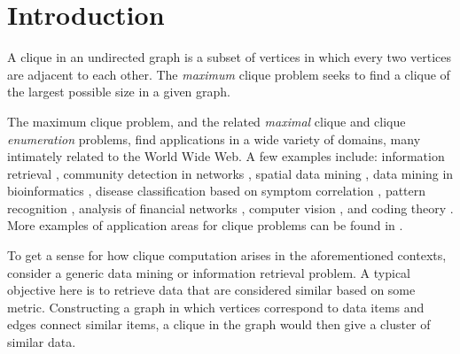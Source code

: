 \section{Introduction}
\label{sec:intro}

A clique in an undirected graph is a subset of vertices in which every two vertices
are adjacent to each other. The {\em maximum} clique problem seeks to find 
a clique of the largest possible size in a given graph.

The maximum clique problem, and the related {\em maximal} clique and 
clique {\em enumeration} problems, find applications in a wide variety of domains,
many intimately related to the World Wide Web. 
A few examples include:  
information retrieval \cite{Augustson:1970:AGT:321607.321608}, 
community detection in networks \cite{Fortunato_2010,cite-key,5586496}, 
spatial data mining \cite{wang2009order},
data mining in bioinformatics \cite{19566964},
disease classification based on symptom correlation \cite{Bonner:1964:CT:1662386.1662389}, 
pattern recognition \cite{1211348},
analysis of financial networks \cite{RePEc:eee:csdana:v:48:y:2005:i:2:p:431-443},
computer vision \cite{Horaud:1989:SCT:68871.68875}, and
coding theory \cite{brouwer}.
More examples of application areas for clique problems can be found in 
\cite{Gutin2004,citeulike:4058448}.

To get a sense for how clique computation arises in the aforementioned contexts, 
consider a generic data mining or information retrieval problem. A typical objective
here is to retrieve data that are considered similar based on some metric. 
Constructing a graph in which vertices correspond to data items and 
edges connect similar items, a clique in the graph would then give a cluster of similar data. 

